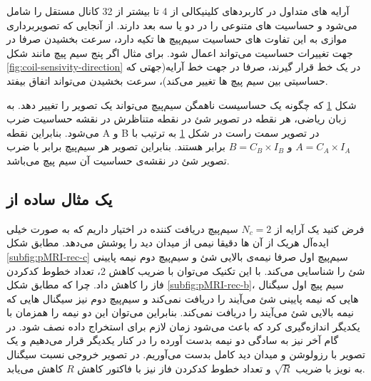 آرایه های متداول در  کاربردهای کلینیکالی از 4 تا بیشتر از 32 کانال مستقل را شامل می‌شود و حساسیت های متنوعی را در دو یا سه بعد دارند. از آنجایی که تصویربرداری موازی به این تفاوت های حساسیت سیم‌پیچ ها تکیه دارد، سرعت بخشیدن صرفا در جهت تغییرات حساسیت می‌تواند اعمال شود. برای مثال اگر پنج سیم پیچ مانند شکل
 \ref{fig:coil-sensivity-direction} 
در یک خط قرار گیرند، صرفا در جهت خط آرایه(جهتی که حساسیتی بین سیم پیچ ها تغییر می‌کند)، سرعت بخشیدن می‌تواند اتفاق بیفتد. \cite{ParallelMRImaging2012}



شکل \ref{fig:coil-sensivity-product}
که چگونه یک حساسیست ناهمگن سیم‌پیچ می‌تواند یک تصویر \mr را تغییر دهد. به زبان ریاضی، هر نقطه در تصویر شئ در نقطه متناظرش در نقشه حساسیت
ضرب می‌شود. بنابراین نقطه‌ A و B در تصویر سمت راست در شکل \ref{fig:coil-sensivity-product}
به ترتیب با $A=C_A \times I_A$ و $B=C_B \times I_B$ برابر هستند. بنابراین تصویر هر سیم‌پیچ برابر با ضرب تصویر شئ در نقشه‌ی حساسیت آن سیم پیچ می‌باشد.


\begin{figure}[t!]
	\centering
	\removevspace[1]
	\caption{}
	\label{fig:coil-sensivity-product}
\end{figure}

\subsection{یک مثال ساده از }

فرض کنید یک آرایه از $N_c = 2$ سیم‌پیچ دریافت کننده در اختیار داریم که به صورت خیلی ایده‌آل هریک از آن ها دقیقا نیمی از میدان دید 
را پوشش می‌دهد. مطابق شکل \ref{subfig:pMRI-rec-c}
سیم‌پیچ اول صرفا نیمه‌ی بالایی شئ و سیم‌پیچ دوم نیمه پایینی شئ را شناسایی می‌کند. با این تکنیک می‌توان با ضریب کاهش 2، تعداد خطوط کدکردن فاز را کاهش داد. چرا که مطابق شکل \ref{subfig:pMRI-rec-b}، سیم پیچ اول سیگنال هایی که نیمه پایینی شئ می‌آیند را دریافت نمی‌کند و سیم‌پیچ دوم نیز سیگنال هایی که نیمه بالایی شئ می‌آیند را دریافت نمی‌کند. بنابراین می‌توان این دو نیمه را همزمان با یکدیگر اندازه‌گیری کرد که باعث می‌شود زمان لازم برای استخراج داده نصف شود. در گام آخر نیز به سادگی دو نیمه بدست آورده را در کنار یکدیگر قرار می‌دهیم و یک تصویر با رزولوشن و میدان دید کامل بدست می‌آوریم. در تصویر خروجی نسبت سیگنال به نویز با ضریب $\sqrt{R}$ و تعداد خطوط کدکردن فاز نیز با فاکتور کاهش $R$ کاهش می‌یابد.



